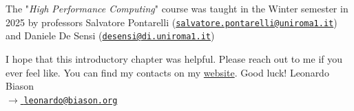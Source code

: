 \begin{tcolorbox}[colback=Dandelion!25, colframe=Dandelion!50]
    \begin{center}
        The "\textit{High Performance Computing}" course was taught in the Winter semester in 2025 by professors Salvatore Pontarelli (\href{mailto:salvatore.pontarelli@uniroma1.it}{\texttt{salvatore.pontarelli@uniroma1.it}}) and Daniele De Sensi (\href{mailto:desensi@di.uniroma1.it}{\texttt{desensi@di.uniroma1.it}})
    \end{center}
\end{tcolorbox}

I hope that this introductory chapter was helpful. Please reach out to me if you ever feel like. You can find my contacts on my \href{https://www.leonardobiason.com}{website}. Good luck! \nl
Leonardo Biason\\
{\footnotesize \href{mailto:leonardo@biason.org}{$\to$ \texttt{leonardo@biason.org}}}